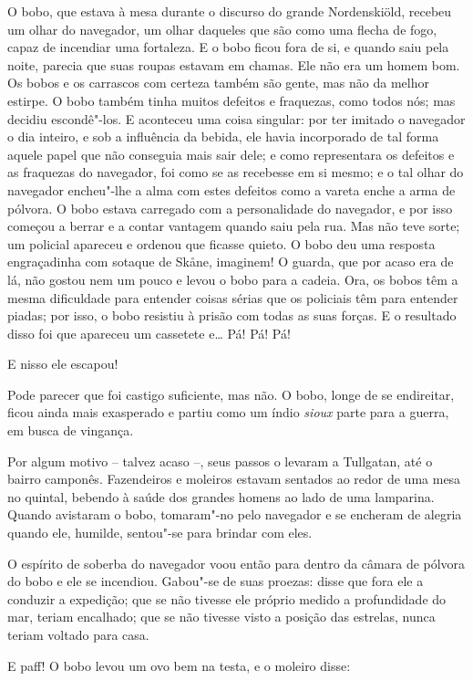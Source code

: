 O bobo, que estava à mesa durante o discurso do grande Nordenskiöld,
recebeu um olhar do navegador, um olhar daqueles que são como uma
flecha de fogo, capaz de incendiar uma fortaleza. E o bobo ficou fora
de si, e quando saiu pela noite, parecia  que suas roupas estavam em
chamas. Ele não era um homem bom. Os bobos e os carrascos com certeza
também são gente, mas não da melhor estirpe. O bobo também tinha muitos
defeitos e fraquezas, como todos nós; mas decidiu escondê"-los. E
aconteceu uma coisa singular: por ter imitado o navegador o dia
inteiro, e sob a influência da bebida, ele havia incorporado de tal
forma aquele papel que não conseguia mais sair dele; e como
representara os defeitos e as fraquezas do navegador, foi como se as
recebesse em si mesmo; e o tal olhar do navegador encheu"-lhe a alma
com estes defeitos como a vareta enche a arma de pólvora. O bobo estava
carregado com a personalidade do navegador, e por isso começou a berrar
e a contar vantagem quando saiu pela rua. Mas não teve sorte; um
policial apareceu e ordenou que ficasse quieto. O bobo deu uma resposta
engraçadinha com sotaque de Sk\r ane, imaginem! O guarda, que por acaso
era de lá, não gostou nem um pouco e levou o bobo para a cadeia. Ora,
os bobos têm a mesma dificuldade para entender coisas sérias que os
policiais têm para entender piadas; por isso, o bobo resistiu à prisão
com todas as suas forças. E o resultado disso foi que apareceu um
cassetete e\ldots{} Pá! Pá! Pá! 

E nisso ele escapou!

Pode parecer que foi castigo suficiente, mas não. O bobo, longe de se
endireitar, ficou ainda mais exasperado e partiu como um índio
\textit{sioux} parte para a guerra, em busca de vingança. 

Por algum motivo -- talvez acaso --, seus passos o levaram a Tullgatan,
até o bairro camponês. Fazendeiros e moleiros estavam sentados ao redor
de uma mesa no quintal, bebendo à saúde dos grandes homens ao lado de
uma lamparina. Quando avistaram o bobo, tomaram"-no pelo navegador e
se encheram de alegria quando ele, humilde, sentou"-se para brindar
com eles.

O espírito de soberba do navegador voou então para dentro da câmara de
pólvora do bobo e ele se incendiou. Gabou"-se de suas proezas: disse
que fora ele a conduzir a expedição; que se não tivesse ele próprio
medido a profundidade do mar, teriam encalhado; que se não tivesse
visto a posição das estrelas, nunca teriam voltado para casa.

E paff! O bobo levou um ovo bem na testa, e o moleiro disse:

